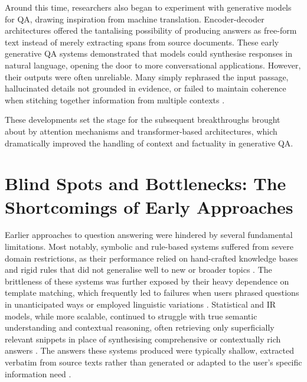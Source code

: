 \begin{spacing}{1.5}
Around this time, researchers also began to experiment with generative models for QA, drawing inspiration from machine translation. Encoder-decoder architectures offered the tantalising possibility of producing answers as free-form text instead of merely extracting spans from source documents. These early generative QA systems demonstrated that models could synthesise responses in natural language, opening the door to more conversational applications. However, their outputs were often unreliable. Many simply rephrased the input passage, hallucinated details not grounded in evidence, or failed to maintain coherence when stitching together information from multiple contexts \citep{caballero_brief_2021}.

These developments set the stage for the subsequent breakthroughs brought about by attention mechanisms and transformer-based architectures, which dramatically improved the handling of context and factuality in generative QA.

\section{Blind Spots and Bottlenecks: The Shortcomings of Early Approaches}
Earlier approaches to question answering were hindered by several fundamental limitations. Most notably, symbolic and rule-based systems suffered from severe domain restrictions, as their performance relied on hand-crafted knowledge bases and rigid rules that did not generalise well to new or broader topics \citep{alqifari_question_2019}. The brittleness of these systems was further exposed by their heavy dependence on template matching, which frequently led to failures when users phrased questions in unanticipated ways or employed linguistic variations \citep{hirschman_natural_2001}. Statistical and IR models, while more scalable, continued to struggle with true semantic understanding and contextual reasoning, often retrieving only superficially relevant snippets in place of synthesising comprehensive or contextually rich answers \citep{alanazi_question_2021, diefenbach_core_2018}. The answers these systems produced were typically shallow, extracted verbatim from source texts rather than generated or adapted to the user’s specific information need \citep{hirschman_natural_2001,alqifari_question_2019}.


\end{spacing}

